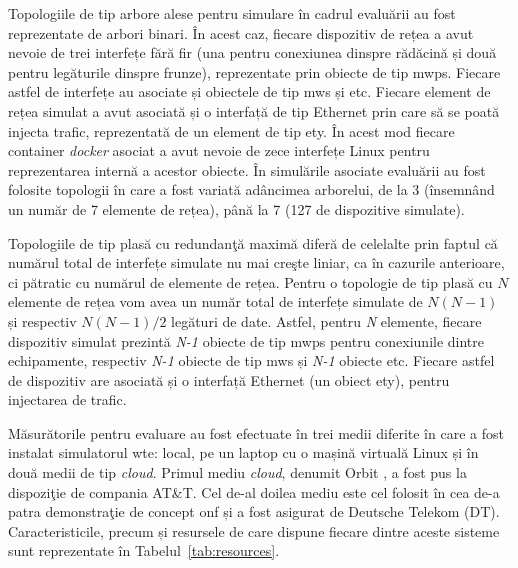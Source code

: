 Topologiile de tip arbore alese pentru simulare în cadrul evaluării au fost reprezentate de arbori binari. În acest caz, fiecare dispozitiv de rețea a avut nevoie de trei interfețe fără fir (una pentru conexiunea dinspre rădăcină și două pentru legăturile dinspre frunze), reprezentate prin obiecte de tip \gls{mwps}. Fiecare astfel de interfețe au asociate și obiectele de tip \gls{mws} și \gls{etc}. Fiecare element de rețea simulat a avut asociată și o interfață de tip Ethernet prin care să se poată injecta trafic, reprezentată de un element de tip \gls{ety}. În acest mod fiecare container \textit{docker} asociat a avut nevoie de zece interfețe Linux pentru reprezentarea internă a acestor obiecte. În simulările asociate evaluării au fost folosite topologii în care a fost variată adâncimea arborelui, de la 3 (însemnând un număr de 7 elemente de rețea), până la 7 (127 de dispozitive simulate).

Topologiile de tip plasă cu redundanţă maximă diferă de celelalte prin faptul că numărul total de interfețe simulate nu mai creşte liniar, ca în cazurile anterioare, ci pătratic cu numărul de elemente de rețea. Pentru o topologie de tip plasă cu $ N $ elemente de rețea vom avea un număr total de interfețe simulate de $ N(N-1) $ și respectiv $ N(N-1)/2 $ legături de date. Astfel, pentru \textit{N} elemente, fiecare dispozitiv simulat prezintă \textit{N-1} obiecte de tip \gls{mwps} pentru conexiunile dintre echipamente, respectiv \textit{N-1} obiecte de tip \gls{mws} și \textit{N-1} obiecte \gls{etc}. Fiecare astfel de dispozitiv are asociată și o interfață Ethernet (un obiect \gls{ety}), pentru injectarea de trafic.

Măsurătorile pentru evaluare au fost efectuate în trei medii diferite în care a fost instalat simulatorul \gls{wte}: local, pe un laptop cu o mașină virtuală Linux și în două medii de tip \textit{cloud}. Primul mediu \textit{cloud}, denumit Orbit \cite{orbitpage}, a fost pus la dispoziţie de compania AT\&T. Cel de-al doilea mediu este cel folosit în cea de-a patra demonstraţie de concept \gls{onf} și a fost asigurat de Deutsche Telekom (DT). Caracteristicile, precum și resursele de care dispune fiecare dintre aceste sisteme sunt reprezentate în Tabelul~\ref{tab:resources}.

